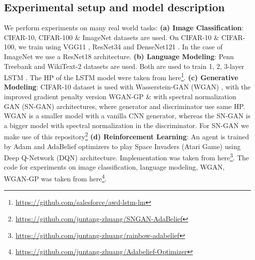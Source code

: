 \subsection{Experimental setup and model description}
We perform experiments on many real world tasks: \textbf{(a) Image Classification}: CIFAR-10, CIFAR-100 \& ImageNet datasets are used. On  CIFAR-10 \& CIFAR-100, we train using VGG11 \cite{VGG}, ResNet34 \cite{Resnet} and DenseNet121 \cite{Densenet} . In the case of ImageNet we use a ResNet18 architecture.  \textbf{(b) Language Modeling}: Penn Treebank \cite{PTB} and WikiText-2 \cite{WikiText_2} datasets are used. Both are used to train 1, 2, 3-layer LSTM \cite{LSTM}. The HP of the LSTM model were taken from here\footnote{\href{https://github.com/salesforce/awd-lstm-lm}{https://github.com/salesforce/awd-lstm-lm}}. \textbf{(c) Generative Modeling}: CIFAR-10 dataset is used with Wasserstein-GAN (WGAN) \cite{WGAN}, with the improved gradient penalty version WGAN-GP \cite{WGAN-GP} \& with spectral normalization GAN (SN-GAN) \cite{SN-GAN} architectures, where generator and discriminator use same HP. WGAN is a smaller model with a vanilla CNN generator, whereas the SN-GAN is a bigger model with spectral normalization in the discriminator. For SN-GAN we make use of this repository\footnote{\href{https://github.com/juntang-zhuang/SNGAN-AdaBelief}{https://github.com/juntang-zhuang/SNGAN-AdaBelief}} \textbf{(d) Reinforcement Learning}: An agent is trained by Adam and AdaBelief optimizers to play Space Invaders (Atari Game) using Deep Q-Network (DQN) \cite{DQN_RL} architecture. Implementation was taken from here\footnote{\label{fnote:juntang_RL_repo}\href{https://github.com/juntang-zhuang/rainbow-adabelief}{https://github.com/juntang-zhuang/rainbow-adabelief}}. The code for experiments on image classification, language modeling, WGAN, WGAN-GP was taken from here\footnote{\label{fnote:juntang_repo}\href{https://github.com/juntang-zhuang/Adabelief-Optimizer}{https://github.com/juntang-zhuang/Adabelief-Optimizer}}.
	
    




